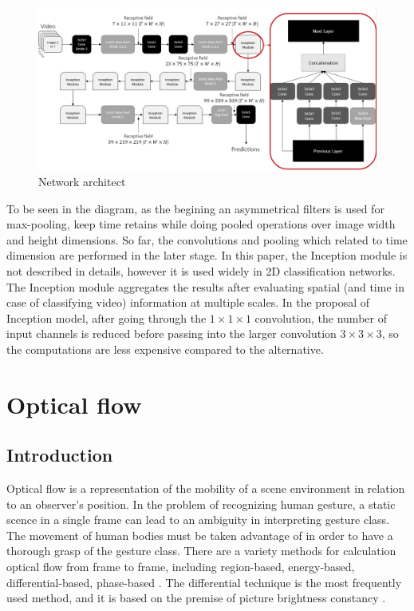 \documentclass[a4paper, 12pt]{article}
\begin{document}
\begin{figure}[H]
    \centering
    \includegraphics[width=\textwidth]{Stream architecture.png}
    \caption{Network architect \citep{carreira2017quo}}
    \label{Figure}
\end{figure}

To be seen in the diagram, as the begining an asymmetrical filters is used for max-pooling, keep time retains while doing pooled operations over image width and height dimensions. So far, the convolutions and pooling which related to time dimension are performed in the later stage. In this paper, the Inception module is not described in details, however it is used widely in 2D classification networks. The Inception module aggregates the results after evaluating spatial (and time in case of classifying video) information at multiple scales. In the proposal of Inception model, after going through the $1 \times 1 \times 1$ convolution, the number of input channels is reduced before passing into the larger convolution $3 \times 3 \times 3$, so the computations are less expensive compared to the alternative.

\section{Optical flow}
\subsection{Introduction}
Optical flow is a representation of the mobility of a scene environment in relation to an observer's position. In the problem of recognizing human gesture, a static scence in a single frame can lead to an ambiguity in interpreting gesture class.  The movement of human bodies must be taken advantage of in order to have a thorough grasp of the gesture class. There are a variety methods for calculation optical flow from frame to frame, including region-based, energy-based, differential-based, phase-based \citep{marco2018computer}. The differential technique is the most frequently used method, and it is based on the premise of picture brightness constancy \citep{horn1981determining}.
\end{document}
